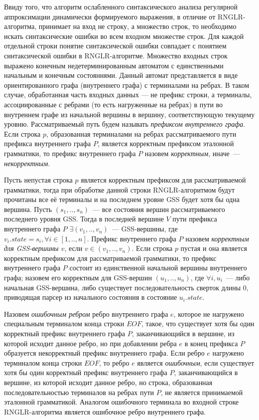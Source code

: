 Ввиду того, что алгоритм ослабленного синтаксического анализа регулярной аппроксимации динамически формируемого выражения, в отличие от RNGLR-алгоритма, принимает на вход не строку, а множество строк, то необходимо искать синтаксические ошибки во всем входном множестве строк. Для каждой отдельной строки понятие синтаксической ошибки совпадает с понятием синтаксической ошибки в RNGLR-алгоритме. Множество входных строк выражено конечным недетерминированным автоматом с единственными начальным и конечным состояниями. Данный автомат представляется в виде ориентированного графа (внутреннего графа) с терминалами на ребрах. В таком случае, обработанная часть входных данных --– не префикс строки, а терминалы, ассоциированные с ребрами (то есть нагруженные на ребрах) в пути во внутреннем графе из начальной вершины в вершину, соответствующую текущему уровню. Рассматриваемый путь будем называть \emph{префиксом внутреннего графа}. Если строка $p$, образованная терминалами на ребрах рассматриваемого пути префикса внутреннего графа $P$, является корректным префиксом эталонной грамматики, то префикс внутреннего графа $P$ назовем \emph{корректным}, иначе~--- \emph{некорректным}.

Пусть непустая строка $p$ является корректным префиксом для рассматриваемой грамматики, тогда при обработке данной строки RNGLR-алгоритмом будут прочитаны все её терминалы и на последнем уровне GSS будет хотя бы одна вершина. Пусть $(s_{1},..,s_{n})$~--- все состояния вершин рассматриваемого последнего уровня GSS. Тогда в последней вершине $V$ пути префикса внутреннего графа $P$ $\exists (v_{1},..,v_{n})$~--- GSS-вершины, где $v_{i}.state = s_{i}, \forall i \in [1,..,n]$. Префикс внутреннего графа $P$ назовем \emph{корректным для GSS-вершины $v$}, если $v \in (v_{1},..,v_{n})$.  Если строка $p$ пустая и она является корректным префиксом для рассматриваемой грамматики, то префикс внутреннего графа $P$ состоит из единственной начальной вершины внутреннего графа; назовем его корректным для GSS-вершин $(u_{1},..,u_{n})$, где $\forall i, u_{i}$~--- либо начальная GSS-вершина, либо существует последовательность сверток длины 0, приводящая парсер из начального состояния в состояние $u_{i}.state$.

Назовем \emph{ошибочным ребром} ребро внутреннего графа $e$, которое не нагружено специальным терминалом конца строки $EOF$, такое, что существует хотя бы один корректный префикс внутреннего графа $P$, заканчивающийся в вершине, из которой исходит данное ребро, но при добавлении ребра $e$ в конец префикса $P$ образуется некорректный префикс внутреннего графа. Если ребро $e$ нагружено терминалом конца строки $EOF$, то ребро $e$ является \emph{ошибочным}, если существует хотя бы один корректный префикс внутреннего графа $P$, заканчивающийся в вершине, из которой исходит данное ребро, но строка, образованная последовательностью терминалов на ребрах пути $P$, не является принимаемой эталонной грамматикой. Аналогом ошибочного терминала во входной строке RNGLR-алгоритма является ошибочное ребро внутреннего графа.

